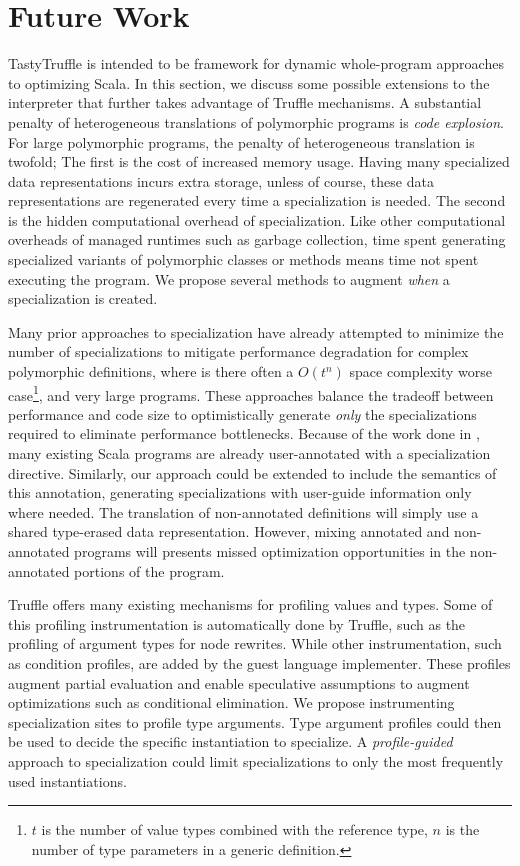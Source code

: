 \chapter{Future Work}

TastyTruffle is intended to be framework for dynamic whole-program approaches to optimizing Scala.
In this section, we discuss some possible extensions to the interpreter that further takes advantage of Truffle mechanisms.
A substantial penalty of heterogeneous translations of polymorphic programs is \textit{code explosion}.
For large polymorphic programs, the penalty of heterogeneous translation is twofold; 
The first is the cost of increased memory usage.
Having many specialized data representations incurs extra storage, unless of course, these data representations are regenerated every time a specialization is needed.
The second is the hidden computational overhead of specialization. 
Like other computational overheads of managed runtimes such as garbage collection, time spent generating specialized variants of polymorphic classes or methods means time not spent executing the program.
We propose several methods to augment \textit{when} a specialization is created.

Many prior approaches to specialization have already attempted to minimize the number of specializations to mitigate performance degradation for complex polymorphic definitions, where is there often a \(O(t^n)\) space complexity worse case\footnote{$t$ is the number of value types combined with the reference type, $n$ is the number of type parameters in a generic definition.}, and very large programs.
These approaches balance the tradeoff between performance and code size to optimistically generate \textit{only} the specializations required to eliminate performance bottlenecks.
Because of the work done in \cite{scala:specialization}, many existing Scala programs are already user-annotated with a specialization directive.
Similarly, our approach could be extended to include the semantics of this annotation, generating specializations with user-guide information only where needed.
The translation of non-annotated definitions will simply use a shared type-erased data representation.
However, mixing annotated and non-annotated programs will presents missed optimization opportunities in the non-annotated portions of the program.

Truffle offers many existing mechanisms for profiling values and types.
Some of this profiling instrumentation is automatically done by Truffle, such as the profiling of argument types for node rewrites.
While other instrumentation,  such as condition profiles, are added by the guest language implementer.
These profiles augment partial evaluation and enable speculative assumptions to augment optimizations such as conditional elimination.
We propose instrumenting specialization sites to profile type arguments.
Type argument profiles could then be used to decide the specific instantiation to specialize.
A \textit{profile-guided} approach to specialization could limit specializations to only the most frequently used instantiations.

